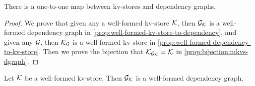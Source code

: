 \begin{theorem}
\label{thm:kv2graph}
There is a one-to-one map between kv-stores and dependency graphs.
\end{theorem}
\begin{proof}
    We prove that given any a well-formed kv-store \( \mathcal{K} \), then $\mathcal{G}_{\mathcal{K}}$ is a well-formed dependency graph in \cref{prop:well-formed-kv-store-to-dependency},
    and given any \( \mathcal{G} \), then  $\mathcal{K}_{\mathcal{G}}$ is a well-formed kv-store in \cref{prop:well-formed-dependency-to-kv-store}.
    Then we prove the bijection that $\mathcal{K}_{\mathcal{G}_{\mathcal{K}}} = \mathcal{K}$ in \cref{prop:bijection:mkvs-dgraph}.
\end{proof}



\begin{proposition}
\label{prop:well-formed-kv-store-to-dependency}
Let $\mathcal{K}$ be a well-formed kv-store. Then $\mathcal{G}_{\mathcal{K}}$ is a well-formed dependency graph.
\end{proposition}

